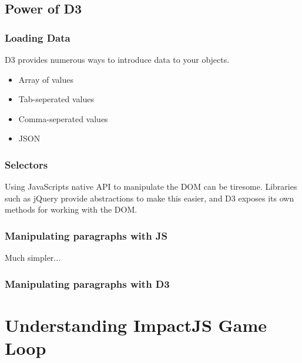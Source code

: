 \documentclass[red]{beamer}
\begin{document}
\subsection{Power of D3}

\begin{frame}
  \frametitle{Loading Data}   %
  D3 provides numerous ways to introduce data to your objects. 
  \begin{itemize}
  \item<1-> Array of values
  \item<2-> Tab-seperated values
  \item<3-> Comma-seperated values
  \item<4-> JSON
  \end{itemize}
\end{frame}

\begin{frame}
	\frametitle{Selectors}
    Using JavaScripts native API to manipulate the DOM can be tiresome. Libraries such as jQuery provide abstractions to make this easier, and D3 exposes its own methods for working with the DOM. 

\end{frame}

\begin{frame}
 	\frametitle{Manipulating paragraphs with JS}
		\lstll
\end{frame}

\begin{frame}
    Much simpler...
    \frametitle{Manipulating paragraphs with D3}
    \lstlll
\end{frame}

\section{Understanding ImpactJS Game Loop}
\end{document}
